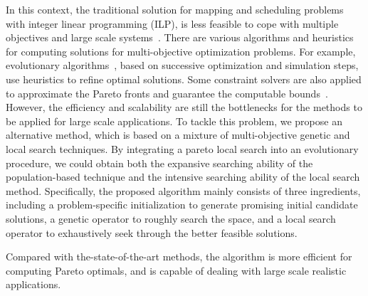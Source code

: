 In this context, the traditional solution for mapping and scheduling problems with integer linear programming (ILP), is less feasible to cope with multiple objectives and large scale systems~\cite{DBLP:journals/jcp/YaoZW14,HuangYYZYBJF15}. There are various algorithms and heuristics for computing solutions for multi-objective optimization problems. For example, evolutionary algorithms~\cite{Yang2009,konak2006multi},  based on successive optimization and simulation steps, use heuristics to refine optimal solutions.
Some constraint solvers are also applied to approximate the Pareto fronts and guarantee the computable bounds~\cite{legriel2010approximating}.
However, the efficiency and scalability are still the bottlenecks for the methods to be applied for large scale applications.
To tackle this problem, we propose an alternative method, %
which is based on a mixture of multi-objective genetic and local search techniques. By integrating a pareto local search  into an evolutionary procedure, we could obtain both the expansive searching ability of the population-based technique and the intensive searching ability of the local search method.
Specifically, the proposed algorithm mainly consists of three ingredients, including a problem-specific initialization to generate promising initial candidate solutions, a genetic operator to roughly search the space, and a local search operator to exhaustively seek through the better feasible solutions.%

Compared with the-state-of-the-art methods, the algorithm is more efficient for computing Pareto optimals, and is capable of dealing with large scale realistic applications.


